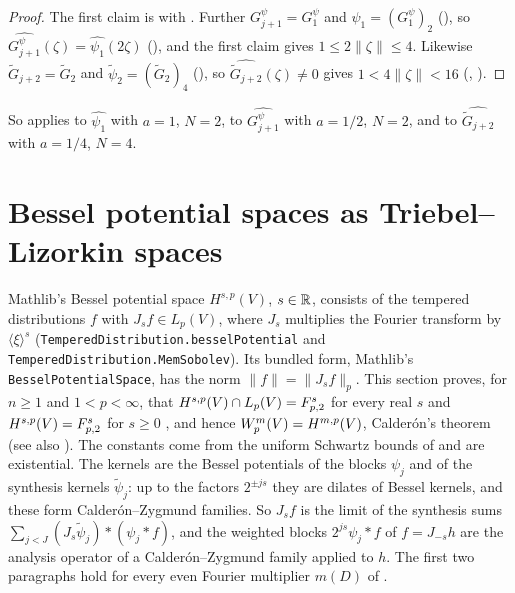 \begin{proof}
\leanok
The first claim is  with . Further
$G^{\psi}_{j+1} = G^{\psi}_1$ and $\psi_1 = (G^{\psi}_1)_2$ (), so
$\widehat{G^{\psi}_{j+1}}(\zeta) = \widehat{\psi_1}(2 \zeta)$ (), and the
first claim gives $1 \leq 2 \|\zeta\| \leq 4$. Likewise $\tilde G_{j+2} = \tilde G_2$ and
$\tilde\psi_2 = (\tilde G_2)_4$ (), so
$\widehat{\tilde G_{j+2}}(\zeta) \neq 0$ gives $1 < 4 \|\zeta\| < 16$
(, ).
\end{proof}

So  applies to $\widehat{\psi_1}$ with $a = 1$, $N = 2$, to
$\widehat{G^{\psi}_{j+1}}$ with $a = 1/2$, $N = 2$, and to $\widehat{\tilde G_{j+2}}$ with
$a = 1/4$, $N = 4$.

\section{Bessel potential spaces as Triebel--Lizorkin spaces}
\label{sec:bessel-potential-lifting}

Mathlib's Bessel potential space $H^{s,p}(V)$, $s \in \mathbb{R}$, consists of the tempered
distributions $f$ with $J_s f \in L_p(V)$, where $J_s$ multiplies the Fourier transform by
$\langle \xi \rangle^s$ (\texttt{TemperedDistribution.\allowbreak besselPotential} and
\texttt{TemperedDistribution.\allowbreak MemSobolev}). Its bundled form, Mathlib's
\texttt{BesselPotentialSpace}, has the norm $\|f\| = \|J_s f\|_p$. This section proves, for
$n \geq 1$ and $1 < p < \infty$, that $H^{s,p}(V) \cap L_p(V) = F^{s}_{p,2}$ for every real $s$
and $H^{s,p}(V) = F^{s}_{p,2}$ for $s \geq 0$ \cite{Triebel}, and hence
$W^{m}_{p}(V) = H^{m,p}(V)$, Calder\'on's theorem~\cite{Calderon1961} (see also
\cite[Chapter V, \S 3, Theorem 3]{SteinSingular}). The constants come from the uniform Schwartz
bounds of
 and are existential. The kernels are the Bessel potentials of the
blocks $\psi_j$ and of the synthesis kernels
$\tilde\psi_j$: up to the factors $2^{\pm js}$ they are dilates of Bessel kernels, and these form
Calder\'on--Zygmund families. So $J_s f$ is the limit of the synthesis sums
$\sum_{j < J} (J_s \tilde\psi_j) * (\psi_j * f)$, and the weighted blocks $2^{js} \psi_j * f$ of
$f = J_{-s} h$ are the analysis operator of a Calder\'on--Zygmund family applied to $h$. The
first two paragraphs hold for every even Fourier multiplier $m(D)$ of
.

